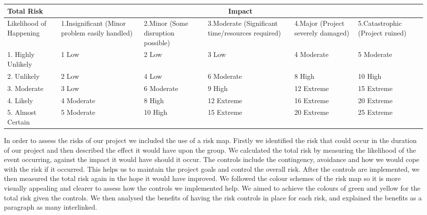 \documentclass[12pt]{article}
\begin{document}
    
		    \setlength{\arrayrulewidth}{1.5\arrayrulewidth}
		    \setlength{\arrayrulewidth}{1.5\arrayrulewidth}
	    	\begin{tabular}{|p{2.5cm}|p{2.3cm}|p{2.3cm}|p{2.3cm}|p{2.3cm}|p{2.5cm}|}
	    		\hline
	    		Total Risk & \multicolumn{5}{c|}{Impact} \\ \hline
	    		Likelihood of Happening & \cellcolor{green!25}1.Insignificant {\scriptsize (Minor problem easily handled)} & \cellcolor{green!33}2.Minor {\scriptsize (Some disruption possible)} & \cellcolor{yellow!50}3.Moderate {\scriptsize (Significant time/resources required)} & \cellcolor{orange!50}4.Major {\scriptsize (Project severely damaged)} & \cellcolor{red!66}5.Catastrophic {\scriptsize (Project ruined)} \\[30pt] \hline
	    		\cellcolor{green!25}1. Highly Unlikely & \cellcolor{green!75}1 Low & \cellcolor{green!75}2 Low & \cellcolor{green!75}3 Low & \cellcolor{yellow!100}4 Moderate & \cellcolor{yellow!100}5 Moderate \\[30pt] \hline
	    		\cellcolor{green!33}2. Unlikely & \cellcolor{green!75}2 Low & \cellcolor{yellow!100}4 Low & \cellcolor{yellow!100}6 Moderate & \cellcolor{orange!83}8 High & \cellcolor{orange!83}10 High \\[30pt] \hline
	    		\cellcolor{yellow!50}3. Moderate & \cellcolor{green!75}3 Low & \cellcolor{yellow!100}6 Moderate & \cellcolor{orange!83}9 High & \cellcolor{red!100}12 Extreme & \cellcolor{red!100}15 Extreme \\[30pt] \hline
	    		\cellcolor{orange!50}4. Likely & \cellcolor{yellow!100}4 Moderate & \cellcolor{orange!83}8 High & \cellcolor{red!100}12 Extreme & \cellcolor{red!100}16 Extreme & \cellcolor{red!100}20 Extreme \\[30pt] \hline
	    		\cellcolor{red!66}5. Almost Certain & \cellcolor{yellow!100}5 Moderate & \cellcolor{orange!83}10 High & \cellcolor{red!100}15 Extreme & \cellcolor{red!100}20 Extreme & \cellcolor{red!100}25 Extreme \\[30pt] \hline
	    	\end{tabular}
	    	
     In order to assess the risks of our project we included the use of a risk map. Firstly we identified the risk that could occur in the duration of our project and then described the effect it would have upon the group. We calculated the total risk by measuring the likelihood of the event occurring, against the impact it would have should it occur. The controls include the contingency, avoidance and how we would cope with the risk if it occurred. This helps us to maintain the project goals and control the overall risk. After the controls are implemented, we then measured the total risk again in the hope it would have improved. We followed the colour schemes of the risk map so it is more visually appealing and clearer to assess how the controls we implemented help. We aimed to achieve the colours of green and yellow for the total risk given the controls. We then analysed the benefits of having the risk controls in place for each risk, and explained the benefits as a paragraph as many interlinked.
     
\end{document}
